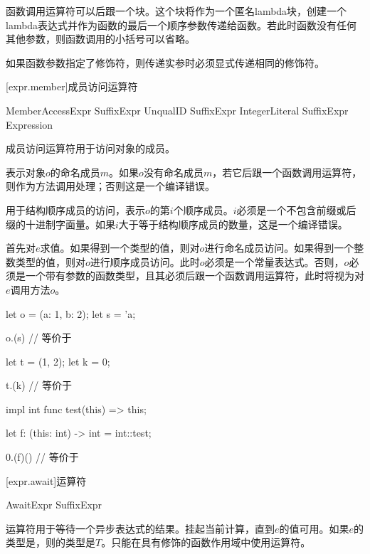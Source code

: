 \pnum
函数调用运算符可以后跟一个块。这个块将作为一个匿名lambda块，创建一个lambda表达式并作为函数的最后一个顺序参数传递给函数。若此时函数没有任何其他参数，则函数调用的小括号可以省略。

\pnum
如果函数参数指定了修饰符，则传递实参时必须显式传递相同的修饰符。

[expr.member]{成员访问运算符}

\begin{bnf}{MemberAccessExpr}
    SuffixExpr  UnqualID \br
    SuffixExpr  IntegerLiteral \br
    SuffixExpr  \terminal{(} Expression \terminal{)}
\end{bnf}

\pnum
成员访问运算符用于访问对象的成员。

\pnum
{}表示对象$o$的命名成员$m$。如果$o$没有命名成员$m$，若它后跟一个函数调用运算符，则作为方法调用处理；否则这是一个编译错误。

\pnum
{}用于结构顺序成员的访问，表示$o$的第$i$个顺序成员。$i$必须是一个不包含前缀或后缀的十进制字面量。如果$i$大于等于结构顺序成员的数量，这是一个编译错误。

\pnum
{}首先对$e$求值。如果得到一个类型的值，则对$o$进行命名成员访问。如果得到一个整数类型的值，则对$o$进行顺序成员访问。此时$o$必须是一个常量表达式。否则，$o$必须是一个带有参数的函数类型，且其必须后跟一个函数调用运算符，此时将视为对$e$调用方法$o$。

\enterexample
\begin{codeblock}
let o = (a: 1, b: 2);
let s = 'a;

o.(s) // 等价于

let t = (1, 2);
let k = 0;

t.(k) // 等价于

impl int {
    func test(this) => this;
}

let f: (this: int) -> int = int::test;

0.(f)() // 等价于
\end{codeblock}
\exitexample

[expr.await]{运算符}

\begin{bnf}{AwaitExpr}
    SuffixExpr  
\end{bnf}

\pnum
{}运算符用于等待一个异步表达式的结果。挂起当前计算，直到$e$的值可用。如果$e$的类型是，则的类型是$T$。只能在具有修饰的函数作用域中使用运算符。

